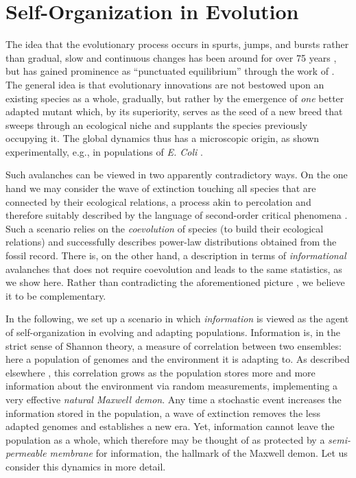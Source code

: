 \documentclass[letterpaper]{article}
\begin{document}
\section{Self-Organization in Evolution}
The idea that the evolutionary process occurs in spurts, jumps, and
bursts rather than gradual, slow and continuous changes has been
around for over 75 years \citep{WIL}, but has gained prominence as
``punctuated equilibrium'' through the work of \citet{GE77,GE93}. The
general idea is that evolutionary innovations are not bestowed upon an
existing species as a whole, gradually, but rather by the emergence of
{\em one} better adapted mutant which, by its superiority, serves as
the seed of a new breed that sweeps through an ecological niche and
supplants the species previously occupying it. The global dynamics
thus has a microscopic origin, as shown experimentally, e.g., in
populations of {\it E. Coli} \citep{ECL96}.

Such avalanches can be viewed in two apparently contradictory ways. On
the one hand we may consider the wave of extinction touching all
species that are connected by their ecological relations, a process
akin to percolation and therefore suitably described by the language
of second-order critical phenomena \citep{BS}. Such a scenario relies
on the {\em coevolution} of species (to build their ecological
relations) and successfully describes power-law distributions obtained
from the fossil record. There is, on the other hand,
a description in terms of {\em informational} avalanches that does not
require coevolution and leads to the same statistics, as we show
here. Rather than contradicting the aforementioned picture
\citep{NFST}, we believe it to be complementary.

In the following, we set up a scenario in which {\em information} is
viewed as the agent of self-organization in evolving and adapting
populations. Information is, in the strict sense of Shannon theory, a
measure of correlation between two ensembles: here a population of
genomes and the environment it is adapting to. As described elsewhere
\citep{IAL}, this correlation grows as the population stores more and
more information about the environment via random measurements,
implementing a very effective {\em natural Maxwell demon}. Any time a
stochastic event increases the information stored in the population, a
wave of extinction removes the less adapted genomes and establishes a
new era. Yet, information cannot leave the population as a whole,
which therefore may be thought of as protected by a {\em
semi-permeable membrane} for information, the hallmark of the Maxwell
demon. Let us consider this dynamics in more detail.
\end{document}
